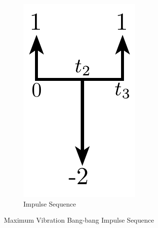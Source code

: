 \begin{figure}[tb!]
\begin{subfigure}{0.3\textwidth}
    \includegraphics[width=\textwidth]{Figures/Ch3/input_shaping/bang_bang_impulses}
     \caption{Impulse Sequence}
     \label{fig:bang_bang_impulse}
  \end{subfigure}
   \caption{Maximum Vibration Bang-bang Impulse Sequence}
   \label{fig:bang_bang}
\end{figure} 

